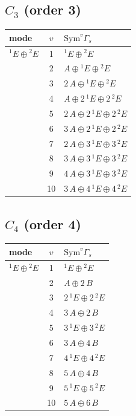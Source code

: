 \documentclass[11pt]{article}
\begin{document}
\subsection*{$C_{3}$ \quad (order 3)}
\begin{longtable}{l c p{}}
\hline mode & $v$ & $\mathrm{Sym}^v\Gamma_s$\\ \hline\endhead
${}^{1}E\oplus {}^{2}E$ & 1 & ${}^{1}E\oplus {}^{2}E$\\
 & 2 & $A\oplus {}^{1}E\oplus {}^{2}E$\\
 & 3 & $2\,A\oplus {}^{1}E\oplus {}^{2}E$\\
 & 4 & $A\oplus 2\,{}^{1}E\oplus 2\,{}^{2}E$\\
 & 5 & $2\,A\oplus 2\,{}^{1}E\oplus 2\,{}^{2}E$\\
 & 6 & $3\,A\oplus 2\,{}^{1}E\oplus 2\,{}^{2}E$\\
 & 7 & $2\,A\oplus 3\,{}^{1}E\oplus 3\,{}^{2}E$\\
 & 8 & $3\,A\oplus 3\,{}^{1}E\oplus 3\,{}^{2}E$\\
 & 9 & $4\,A\oplus 3\,{}^{1}E\oplus 3\,{}^{2}E$\\
 & 10 & $3\,A\oplus 4\,{}^{1}E\oplus 4\,{}^{2}E$\\
\hline
\end{longtable}

\subsection*{$C_{4}$ \quad (order 4)}
\begin{longtable}{l c p{}}
\hline mode & $v$ & $\mathrm{Sym}^v\Gamma_s$\\ \hline\endhead
${}^{1}E\oplus {}^{2}E$ & 1 & ${}^{1}E\oplus {}^{2}E$\\
 & 2 & $A\oplus 2\,B$\\
 & 3 & $2\,{}^{1}E\oplus 2\,{}^{2}E$\\
 & 4 & $3\,A\oplus 2\,B$\\
 & 5 & $3\,{}^{1}E\oplus 3\,{}^{2}E$\\
 & 6 & $3\,A\oplus 4\,B$\\
 & 7 & $4\,{}^{1}E\oplus 4\,{}^{2}E$\\
 & 8 & $5\,A\oplus 4\,B$\\
 & 9 & $5\,{}^{1}E\oplus 5\,{}^{2}E$\\
 & 10 & $5\,A\oplus 6\,B$\\
\hline
\end{longtable}
\end{document}
